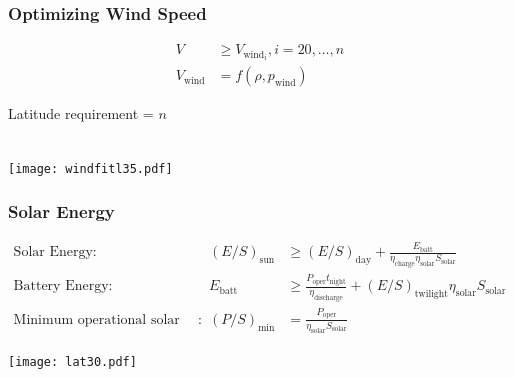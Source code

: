 \documentclass{beamer}
\begin{document}
\begin{frame}
    \frametitle{Optimizing Wind Speed}

    \begin{align*}
        V &\geq V_{\text{wind}_i}, i = 20,\dots,n \\
        V_{\text{wind}} &= f(\rho, p_{\text{wind}})
    \end{align*}

    Latitude requirement = $n$ \\~\\

    \begin{center}
    \texttt{[image: windfitl35.pdf]}
    \end{center}

\end{frame}

\begin{frame}
    \frametitle{Solar Energy}

    \scriptsize
    \[ \begin{array}{lcl}
        \text{Solar Energy} : & (E/S)_{\text{sun}}  &\geq (E/S)_{\text{day}} + \frac{E_{\text{batt}}}{\eta_{\text{charge}}\eta_{\text{solar}} S_{\text{solar}}} \\
        \text{Battery Energy} : &E_{\text{batt}} &\geq \frac{P_{\text{oper}}t_{\text{night}}}{\eta_{\text{discharge}}} + (E/S)_{\text{twilight}} \eta_{\text{solar}} S_{\text{solar}} \\
        \text{Minimum operational solar power} : & (P/S)_{\text{min}} &= \frac{P_{\text{oper}}}{\eta_{\text{solar}} S_{\text{solar}}} 
    \end{array} \]

    \begin{center}
    \texttt{[image: lat30.pdf]}
    \end{center}
\end{frame}
\end{document}
